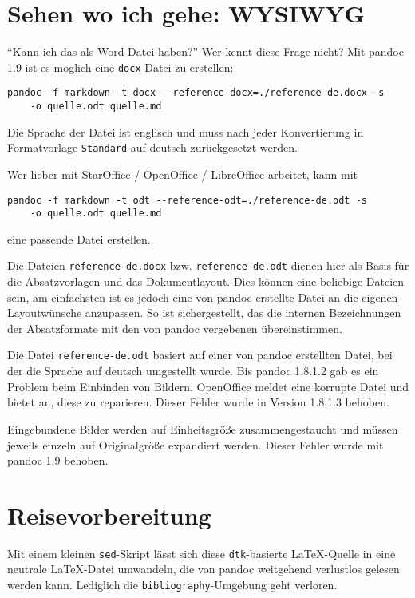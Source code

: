 \documentclass[11pt,ngerman,a4paper]{article}
\begin{document}
\section{Sehen wo ich gehe: WYSIWYG}

\enquote{Kann ich das als Word-Datei haben?} Wer kennt diese Frage
nicht? Mit pandoc 1.9 ist es möglich eine \texttt{docx} Datei zu
erstellen:

\begin{verbatim}
pandoc -f markdown -t docx --reference-docx=./reference-de.docx -s 
    -o quelle.odt quelle.md
\end{verbatim}

Die Sprache der Datei ist englisch und muss nach jeder Konvertierung in
Formatvorlage \texttt{Standard} auf deutsch zurückgesetzt werden.

Wer lieber mit StarOffice / OpenOffice / LibreOffice arbeitet, kann mit

\begin{verbatim}
pandoc -f markdown -t odt --reference-odt=./reference-de.odt -s 
    -o quelle.odt quelle.md
\end{verbatim}

eine passende Datei erstellen.

Die Dateien \texttt{reference-de.docx} bzw. \texttt{reference-de.odt}
dienen hier als Basis für die Absatzvorlagen und das Dokumentlayout.
Dies können eine beliebige Dateien sein, am einfachsten ist es jedoch
eine von pandoc erstellte Datei an die eigenen Layoutwünsche anzupassen.
So ist sichergestellt, das die internen Bezeichnungen der Absatzformate
mit den von pandoc vergebenen übereinstimmen.

Die Datei \texttt{reference-de.odt} basiert auf einer von pandoc
erstellten Datei, bei der die Sprache auf deutsch umgestellt wurde. Bis
pandoc 1.8.1.2 gab es ein Problem beim Einbinden von Bildern. OpenOffice
meldet eine korrupte Datei und bietet an, diese zu reparieren. Dieser
Fehler wurde in Version 1.8.1.3 behoben.

Eingebundene Bilder werden auf Einheitsgröße zusammengestaucht und
müssen jeweils einzeln auf Originalgröße expandiert werden. Dieser
Fehler wurde mit pandoc 1.9 behoben.

\section{Reisevorbereitung}

Mit einem kleinen \texttt{sed}-Skript lässt sich diese
\texttt{dtk}-basierte LaTeX-Quelle in eine neutrale LaTeX-Datei
umwandeln, die von pandoc weitgehend verlustlos gelesen werden kann.
Lediglich die \texttt{bibliography}-Umgebung geht verloren.
\end{document}
